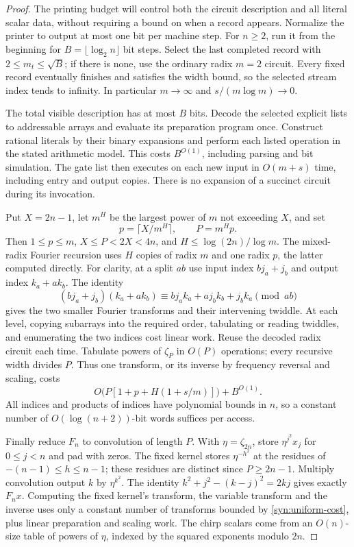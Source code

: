 \begin{proof}
The printing budget will control both the circuit description and all
literal scalar data, without requiring a bound on when a record appears.
Normalize the printer to output at most one bit per machine step.
For $n\ge2$, run it from the beginning for
$B=\lfloor\log_2 n\rfloor$ bit steps.  Select the last completed
record with $2\le m_t\le\sqrt B$; if there is none, use the ordinary radix
$m=2$ circuit.  Every fixed record eventually finishes and satisfies
the width bound, so the selected stream index tends to infinity.
In particular $m\to\infty$ and $s/(m\log m)\to0$.

The total visible description has at most $B$ bits.  Decode the
selected explicit lists to addressable arrays and evaluate its
preparation program once.  Construct rational literals by their
binary expansions and perform each listed operation in the stated
arithmetic model.  This costs $B^{O(1)}$, including parsing and bit
simulation.  The gate list then executes on each new input in
$O(m+s)$ time, including entry and output copies.  There is no
expansion of a succinct circuit during its invocation.

Put $X=2n-1$, let $m^H$ be the largest power of $m$ not exceeding
$X$, and set
\[
 p=\lceil X/m^H\rceil,\qquad P=m^Hp.
\]
Then $1\le p\le m$, $X\le P<2X<4n$, and
$H\le\log(2n)/\log m$.  The mixed-radix Fourier recursion uses $H$
copies of radix $m$ and one radix $p$, the latter computed directly.
For clarity, at a split $ab$ use input index $bj_a+j_b$ and output
index $k_a+ak_b$.  The identity
\[
 (bj_a+j_b)(k_a+ak_b)
 \equiv bj_ak_a+aj_bk_b+j_bk_a\pmod {ab}
\]
gives the two smaller Fourier transforms and their intervening
twiddle.  At each level, copying subarrays into the required order,
tabulating or reading twiddles, and enumerating the two indices cost
linear work.  Reuse the decoded radix circuit each time.  Tabulate
powers of $\zeta_P$ in $O(P)$ operations; every recursive width
divides $P$.  Thus one transform, or its inverse by frequency
reversal and scaling, costs
\begin{equation}\label{syn:uniform-cost}
 O\bigl(P[1+p+H(1+s/m)]\bigr)+B^{O(1)}.
\end{equation}
All indices and products of indices have polynomial bounds in $n$,
so a constant number of $O(\log(n+2))$-bit words suffices per access.

Finally reduce $F_n$ to convolution of length $P$.  With
$\eta=\zeta_{2n}$, store $\eta^{j^2}x_j$ for $0\le j<n$ and pad
with zeros.  The fixed kernel stores $\eta^{-h^2}$ at the residues
of $-(n-1)\le h\le n-1$; these residues are distinct since
$P\ge2n-1$.  Multiply convolution output $k$ by $\eta^{k^2}$.
The identity $k^2+j^2-(k-j)^2=2kj$ gives exactly $F_nx$.
Computing the fixed kernel's transform, the variable transform and
the inverse uses only a constant number of transforms bounded by
\eqref{syn:uniform-cost}, plus linear preparation and scaling work.
The chirp scalars come from an $O(n)$-size table of powers of $\eta$,
indexed by the squared exponents modulo $2n$.


\end{proof}
